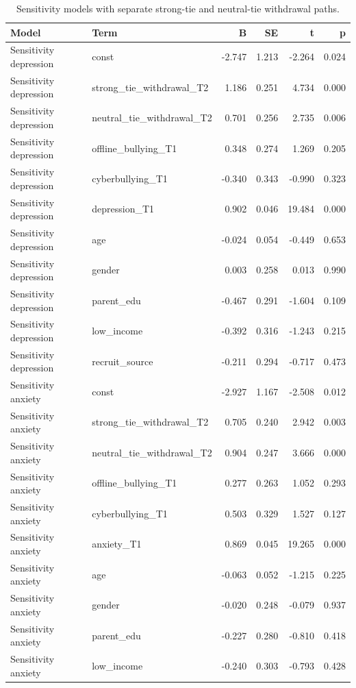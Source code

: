 \begin{table}
\caption{Sensitivity models with separate strong-tie and neutral-tie withdrawal paths.}
\label{tab:sensitivity}
\begin{tabular}{llrrrr}
\toprule
Model & Term & B & SE & t & p \\
\midrule
Sensitivity depression & const & -2.747 & 1.213 & -2.264 & 0.024 \\
Sensitivity depression & strong_tie_withdrawal_T2 & 1.186 & 0.251 & 4.734 & 0.000 \\
Sensitivity depression & neutral_tie_withdrawal_T2 & 0.701 & 0.256 & 2.735 & 0.006 \\
Sensitivity depression & offline_bullying_T1 & 0.348 & 0.274 & 1.269 & 0.205 \\
Sensitivity depression & cyberbullying_T1 & -0.340 & 0.343 & -0.990 & 0.323 \\
Sensitivity depression & depression_T1 & 0.902 & 0.046 & 19.484 & 0.000 \\
Sensitivity depression & age & -0.024 & 0.054 & -0.449 & 0.653 \\
Sensitivity depression & gender & 0.003 & 0.258 & 0.013 & 0.990 \\
Sensitivity depression & parent_edu & -0.467 & 0.291 & -1.604 & 0.109 \\
Sensitivity depression & low_income & -0.392 & 0.316 & -1.243 & 0.215 \\
Sensitivity depression & recruit_source & -0.211 & 0.294 & -0.717 & 0.473 \\
Sensitivity anxiety & const & -2.927 & 1.167 & -2.508 & 0.012 \\
Sensitivity anxiety & strong_tie_withdrawal_T2 & 0.705 & 0.240 & 2.942 & 0.003 \\
Sensitivity anxiety & neutral_tie_withdrawal_T2 & 0.904 & 0.247 & 3.666 & 0.000 \\
Sensitivity anxiety & offline_bullying_T1 & 0.277 & 0.263 & 1.052 & 0.293 \\
Sensitivity anxiety & cyberbullying_T1 & 0.503 & 0.329 & 1.527 & 0.127 \\
Sensitivity anxiety & anxiety_T1 & 0.869 & 0.045 & 19.265 & 0.000 \\
Sensitivity anxiety & age & -0.063 & 0.052 & -1.215 & 0.225 \\
Sensitivity anxiety & gender & -0.020 & 0.248 & -0.079 & 0.937 \\
Sensitivity anxiety & parent_edu & -0.227 & 0.280 & -0.810 & 0.418 \\
Sensitivity anxiety & low_income & -0.240 & 0.303 & -0.793 & 0.428 \\

\end{tabular}
\end{table}
